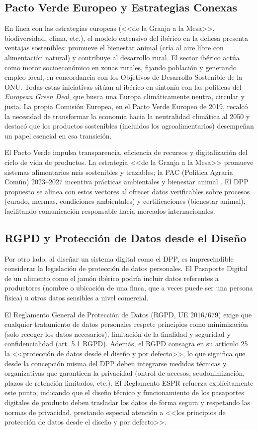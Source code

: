 \subsection{Pacto Verde Europeo y Estrategias Conexas}\label{sec:marco-pactoverde}
En línea con las estrategias europeas (<<de la Granja a la Mesa>>, biodiversidad, clima, etc.), el modelo extensivo del ibérico en la dehesa presenta ventajas sostenibles: promueve el bienestar animal (cría al aire libre con alimentación natural) y contribuye al desarrollo rural. El sector ibérico actúa como motor socioeconómico en zonas rurales, fijando población y generando empleo local, en concordancia con los Objetivos de Desarrollo Sostenible de la ONU. Todas estas iniciativas sitúan al ibérico en sintonía con las políticas del \textit{European Green Deal}, que busca una Europa climáticamente neutra, circular y justa. La propia Comisión Europea, en el Pacto Verde Europeo de 2019, recalcó la necesidad de transformar la economía hacia la neutralidad climática al 2050 y destacó que los productos sostenibles (incluidos los agroalimentarios) desempeñan un papel esencial en esa transición.

El Pacto Verde impulsa transparencia, eficiencia de recursos y digitalización del ciclo de vida de productos. La estrategia <<de la Granja a la Mesa>> promueve sistemas alimentarios más sostenibles y trazables; la PAC (Política Agraria Común) 2023–2027 incentiva prácticas ambientales y bienestar animal \cite{FarmForkStrategy}. El DPP propuesto se alinea con estos vectores al ofrecer datos verificables sobre procesos (curado, mermas, condiciones ambientales) y certificaciones (bienestar animal), facilitando comunicación responsable hacia mercados internacionales.

\subsection{RGPD y Protección de Datos desde el Diseño}\label{sec:marco-rgpd}
Por otro lado, al diseñar un sistema digital como el DPP, es imprescindible considerar la legislación de protección de datos personales. El Pasaporte Digital de un alimento como el jamón ibérico podría incluir datos referentes a productores (nombre o ubicación de una finca, que a veces puede ser una persona física) u otros datos sensibles a nivel comercial.

El Reglamento General de Protección de Datos (RGPD, UE 2016/679) exige que cualquier tratamiento de datos personales respete principios como minimización (solo recoger los datos necesarios), limitación de la finalidad y seguridad y confidencialidad (art. 5.1 RGPD). Además, el RGPD consagra en su artículo 25 la <<protección de datos desde el diseño y por defecto>>, lo que significa que desde la concepción misma del DPP deben integrarse medidas técnicas y organizativas que garanticen la privacidad (ontrol de accesos, seudonimización, plazos de retención limitados, etc.). El Reglamento ESPR refuerza explícitamente este punto, indicando que el diseño técnico y funcionamiento de los pasaportes digitales de producto deben trasladar los datos de forma segura y respetando las normas de privacidad, prestando especial atención a <<los principios de protección de datos desde el diseño y por defecto>>.

